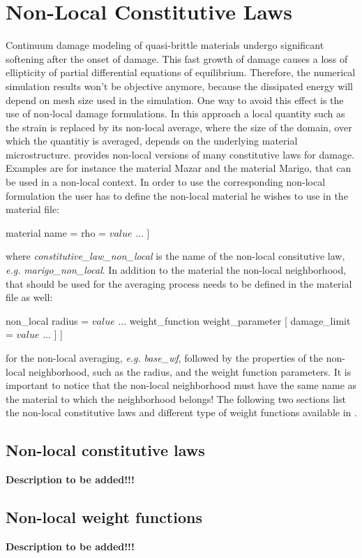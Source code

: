 \section{Non-Local Constitutive Laws \label{sect:smm:CLNL}}

Continuum damage modeling of quasi-brittle materials undergo significant softening after the onset of damage. This fast growth of damage causes a loss of ellipticity of partial differential equations of equilibrium. Therefore, the numerical simulation results won't be objective anymore, because the dissipated energy will depend on mesh size used in the simulation. One way to avoid this effect is the use of non-local damage formulations. In this approach a local quantity such as the strain is replaced by its non-local average, where the size of the domain, over which the quantitiy is averaged, depends on the underlying material microstructure. 
\akantu provides non-local versions of many constitutive laws for damage. Examples are for instance the material Mazar and the material Marigo, that can be used in a non-local context. In order to use the corresponding non-local formulation the user has to define the non-local material he wishes to use in the material file:
\begin{cpp}
  material %
     name = %
     rho = $value$
     ...
  ]
\end{cpp}
where \emph{constitutive\_law\_non\_local} is the name of the non-local consitutive law, \textit{e.g.} \emph{marigo\_non\_local}.
In addition to the material the non-local neighborhood, that should be used for the averaging process needs to be defined in the material file as well: 
\begin{cpp}
  non_local %
     radius = $value$
     ...
      weight_function weight_parameter [
        damage_limit = $value$
        ...
     ]
  ]
\end{cpp}
for the non-local averaging, \textit{e.g.} \emph{base\_wf}, followed by the properties of the non-local neighborhood, such as the radius, and the weight function parameters. It is important to notice that the non-local neighborhood must have the same name as the material to which the neighborhood belongs!
The following two sections list the non-local constitutive laws and different type of weight functions available in \akantu.
\subsection{Non-local constitutive laws}
\textbf{Description to be added!!!}
\subsection{Non-local weight functions}
 \textbf{Description to be added!!!}